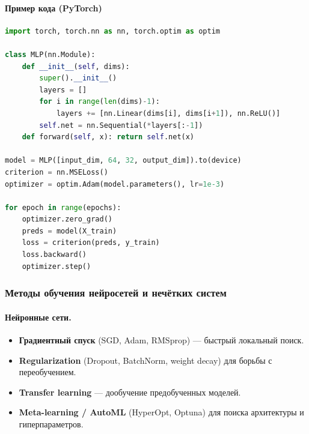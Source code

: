 \paragraph{Пример кода (PyTorch)}
\begin{lstlisting}[language=Python, caption={Простейший цикл обучения MLP на PyTorch}, label={lst:nn_training}]
import torch, torch.nn as nn, torch.optim as optim

class MLP(nn.Module):
    def __init__(self, dims):
        super().__init__()
        layers = []
        for i in range(len(dims)-1):
            layers += [nn.Linear(dims[i], dims[i+1]), nn.ReLU()]
        self.net = nn.Sequential(*layers[:-1])
    def forward(self, x): return self.net(x)

model = MLP([input_dim, 64, 32, output_dim]).to(device)
criterion = nn.MSELoss()
optimizer = optim.Adam(model.parameters(), lr=1e-3)

for epoch in range(epochs):
    optimizer.zero_grad()
    preds = model(X_train)
    loss = criterion(preds, y_train)
    loss.backward()
    optimizer.step()
\end{lstlisting}

\subsubsection{Методы обучения нейросетей и нечётких систем}
\label{subsec:training_methods}

\paragraph{Нейронные сети.}
\begin{itemize}
  \item \textbf{Градиентный спуск} (SGD, Adam, RMSprop) — быстрый локальный поиск.
  \item \textbf{Regularization} (Dropout, BatchNorm, weight decay) для борьбы с переобучением.
  \item \textbf{Transfer learning} — дообучение предобученных моделей.
  \item \textbf{Meta-learning / AutoML} (HyperOpt, Optuna) для поиска архитектуры и гиперпараметров.
\end{itemize}

